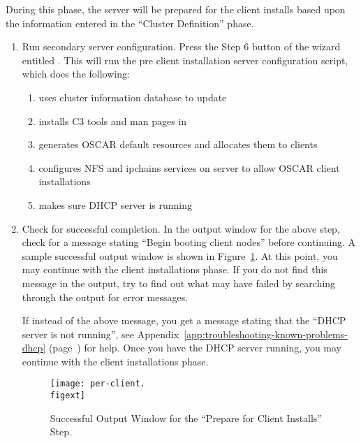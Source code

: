 During this phase, the server will be prepared for the client installs
based upon the information entered in the ``Cluster Definition''
phase.

\begin{enumerate}
\item Run secondary server configuration. Press the Step 6 button of
  the wizard entitled . This will
  run the pre client installation server configuration script, which
  does the following:

  \begin{enumerate}
  \item uses cluster information database to update 
    
  \item installs C3 tools and man pages in 

  \item generates OSCAR default resources and allocates them to clients
    
  \item configures NFS and ipchains services on server to allow OSCAR
    client installations

  \item makes sure DHCP server is running
  \end{enumerate}
  
\item Check for successful completion. In the output window for the
  above step, check for a message stating ``Begin booting client
  nodes'' before continuing. A sample successful output window is
  shown in Figure~\ref{fig:detailed-successful-output-window}. At this
  point, you may continue with the client installations phase. If you
  do not find this message in the output, try to find out what may
  have failed by searching through the output for error messages.
  
  If instead of the above message, you get a message stating that the
  ``DHCP server is not running'', see
  Appendix~\ref{app:troubleshooting-known-problems-dhcp}
  (page~\pageref{app:troubleshooting-known-problems-dhcp}) for help.
  Once you have the DHCP server running, you may continue with the
  client installations phase.
 
  \begin{figure}[htbp]
    \begin{center}
      \texttt{[image: per-client.\\figext]}
      \caption{Successful Output Window for the ``Prepare for Client
        Installs'' Step.}
      \label{fig:detailed-successful-output-window}
    \end{center}
  \end{figure}
\end{enumerate}

